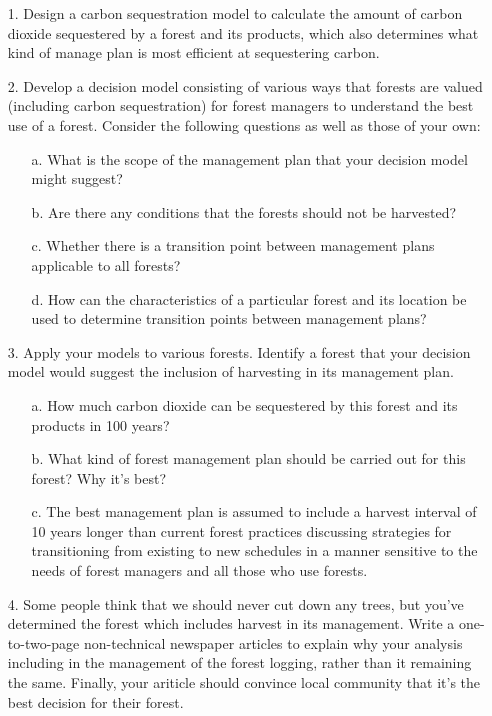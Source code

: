 \documentclass{mcmthesis}
\numberwithin{figure}{section}
\numberwithin{table}{section}
\numberwithin{equation}{section}
\begin{document}
\begin{enumerate}
    \item [1.] Design a carbon sequestration model to calculate the amount of carbon dioxide 
    sequestered by a forest and its products, which also determines what kind of manage plan is
    most efficient at sequestering carbon.
    \item [2.] Develop a decision model consisting of various ways that forests are valued (including
    carbon sequestration) for forest managers to understand the best use of a forest. Consider 
    the following questions as well as those of your own:
    \begin{enumerate}
        \item [a.] What is the scope of the management plan that your decision model might suggest?
        \item [b.] Are there any conditions that the forests should not be harvested?
        \item [c.] Whether there is a transition point between management plans applicable to all forests?
        \item [d.] How can the characteristics of a particular forest and its location be used 
        to determine transition points between management plans?
    \end{enumerate}
    \item [3.] Apply your models to various forests. Identify a forest that your decision model 
    would suggest the inclusion of harvesting in its management plan.
    \begin{enumerate}
        \item [a.] How much carbon dioxide can be sequestered by this forest and its products in 100 years?
        \item [b.] What kind of forest management plan should be carried out for this forest? Why it's best?
        \item [c.] The best management plan is assumed to include a harvest interval of 10 
        years longer than current forest practices discussing strategies for transitioning 
        from existing to new schedules in a manner sensitive to the needs of forest managers 
        and all those who use forests.
    \end{enumerate}
    \item [4.] Some people think that we should never cut down any trees, but you've
    determined the forest which includes harvest in its management. Write a one-to-two-page
    non-technical newspaper articles to explain why your analysis including in the 
    management of the forest logging, rather than it remaining the same. Finally, your ariticle 
    should convince local community that it's the best decision for their forest.
\end{enumerate}
\end{document}
